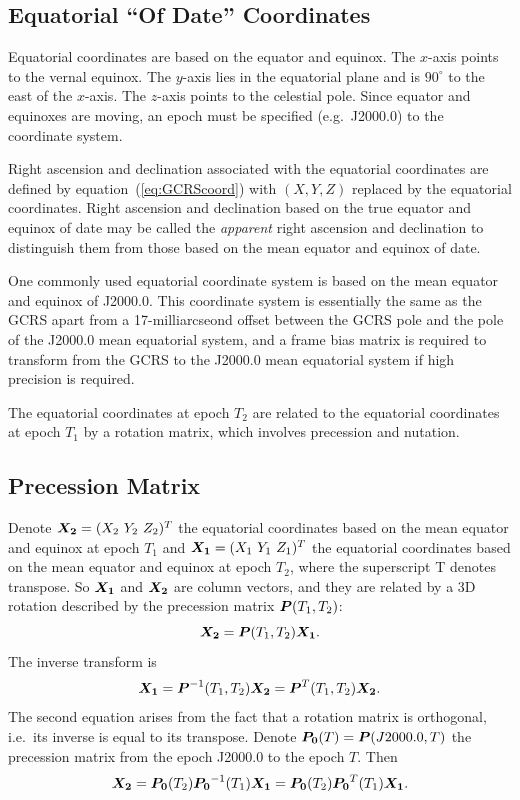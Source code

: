 \documentclass[12pt]{article}
\newcommand \beq {\begin{equation}}
\newcommand \eeq {\end{equation}}
\newcommand{\ve}[1]{\mbox{\boldmath $#1$}}
\begin{document}
\subsection{Equatorial ``Of Date'' Coordinates} 

Equatorial coordinates are based on the equator and equinox. The $x$-axis 
points to the vernal equinox. The $y$-axis lies in the equatorial plane 
and is $90^\circ$ to the east of the $x$-axis. The $z$-axis points to 
the celestial pole. Since equator 
and equinoxes are moving, an epoch must be specified (e.g.\ J2000.0) to the coordinate 
system.  

Right ascension and declination associated with the equatorial coordinates 
are defined by equation~(\ref{eq:GCRScoord}) with $(X,Y,Z)$ replaced by the 
equatorial coordinates. Right ascension and declination based on the 
true equator and equinox of date may be called the {\em apparent} right ascension and 
declination to distinguish them from those based on the mean equator and 
equinox of date.

One commonly used equatorial coordinate system is based on the mean equator and 
equinox of J2000.0. This coordinate system is essentially the same as the GCRS 
apart from a 17-milliarcseond offset between the GCRS pole and the pole of 
the J2000.0 mean equatorial system, and a frame bias matrix is required to 
transform from the GCRS to the J2000.0 mean equatorial system if high precision
is required.

The equatorial coordinates at epoch $T_2$ are related to the equatorial coordinates 
at epoch $T_1$ by a rotation matrix, which involves precession and nutation. 

\subsection{Precession Matrix}

Denote $\ve{X_2}=(X_2\ Y_2\ Z_2)^T$ the equatorial coordinates based on 
the mean equator and equinox at epoch $T_1$ and $\ve{X_1}=(X_1\ Y_1\ Z_1)^T$ 
the equatorial coordinates based on the mean equator and equinox at epoch $T_2$,
where the superscript T denotes transpose. So $\ve{X_1}$ and $\ve{X_2}$ are column 
vectors, and they are related by a 3D rotation described by the precession matrix 
$\ve{P}(T_1,T_2)$: 
\beq
  \ve{X_2} = \ve{P}(T_1,T_2) \ve{X_1} . 
\eeq
The inverse transform is 
\beq
  \ve{X_1} = \ve{P}^{-1}(T_1,T_2) \ve{X_2} = \ve{P}^T(T_1,T_2) \ve{X_2} .
\eeq
The second equation arises from the fact that a rotation matrix is orthogonal, 
i.e.\ its inverse is equal to its transpose. Denote $\ve{P_0}(T)=\ve{P}(J2000.0,T)$ 
the precession matrix from the epoch J2000.0 to the epoch $T$. Then 
\beq
  \ve{X_2} = \ve{P_0}(T_2)\ve{P_0}^{-1}(T_1) \ve{X_1} = 
\ve{P_0}(T_2) \ve{P_0}^T(T_1) \ve{X_1} .
\eeq
\end{document}
